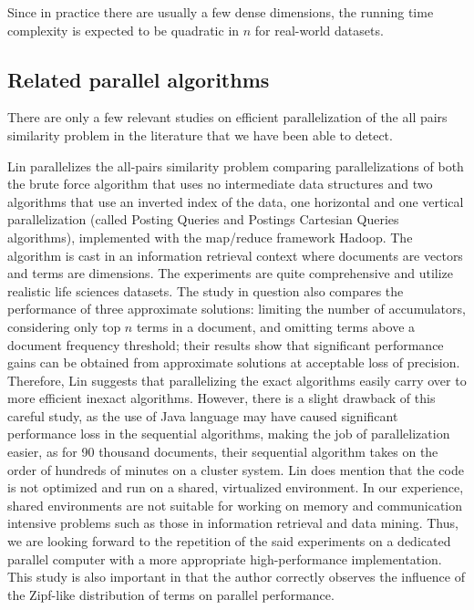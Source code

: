\documentclass{comjnl}
\begin{document}
Since in practice there are usually a few dense dimensions, the running
time complexity is expected to be quadratic in $n$ for real-world
datasets.

\subsection{Related parallel algorithms}

There are only a few relevant studies on efficient parallelization of
the all pairs similarity problem in the literature that we have been
able to detect.

Lin \cite{lin2009} parallelizes the all-pairs similarity problem comparing
parallelizations of both the brute force algorithm that uses no
intermediate data
structures and two algorithms that use an inverted index of the data,
one horizontal and one vertical parallelization (called Posting
Queries and Postings Cartesian Queries algorithms), implemented with
the map/reduce framework Hadoop.  The
algorithm is cast in an information retrieval context where
documents are vectors and terms are dimensions. The experiments are
quite comprehensive and utilize realistic life sciences datasets. The
study in question also compares the performance of three approximate 
solutions: limiting the number of accumulators, considering only top
$n$ terms in a document, and omitting terms above a document frequency
threshold; their results show that significant performance gains can
be obtained from approximate solutions at acceptable loss of
precision. Therefore, Lin suggests that parallelizing the exact
algorithms easily carry over to more efficient inexact 
algorithms. However, there is a slight drawback of this careful study,
as the use of Java language may have caused significant performance
loss in the sequential algorithms, making the job of parallelization
easier, as for 90 thousand documents, their sequential algorithm takes
on the order of hundreds of minutes on a cluster system. Lin does
mention that the code is not optimized and run on a shared,
virtualized environment. In our experience, shared environments are
not suitable for working on memory and communication intensive
problems such as those in information retrieval and data mining. Thus,
we are looking forward to the repetition of the said experiments on a
dedicated parallel computer with a more appropriate high-performance
implementation. This study is also important in that the author
correctly observes the influence of the Zipf-like distribution of
terms on parallel performance.
\end{document}

